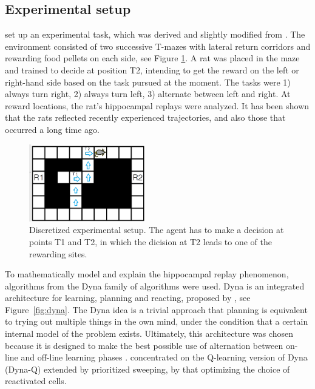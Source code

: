 \documentclass[a4paper]{article}
\begin{document}
	\subsection{Experimental setup}
	\par \cite{NeuralDynaQ} set up an experimental task, which was derived and slightly modified from \cite{GUPTA2010695}. The environment consisted of two successive T-mazes with lateral return corridors and rewarding food pellets on each side, see Figure \ref{fig:setup}. A rat was placed in the maze and trained to decide at position T2, intending to get the reward on the left or right-hand side based on the task pursued at the moment. The tasks were 1) always turn right, 2) always turn left, 3) alternate between left and right. At reward locations, the rat's hippocampal replays were analyzed. It has been shown that the rats reflected recently experienced trajectories, and also those that occurred a long time ago.
	
	\begin{figure}[t]
		\centering
		\includegraphics[angle=0,width=0.45\textwidth]{./figs/setup.png}
		\caption{\label{fig:setup}Discretized experimental setup. The agent has to make a decision at points T1 and T2, in which the dicision at T2 leads to one of the rewarding sites. \citep{NeuralDynaQ}}
	\end{figure}
	
	\par To mathematically model and explain the hippocampal replay phenomenon, algorithms from the Dyna family of algorithms were used. Dyna is an integrated architecture for learning, planning and reacting, proposed by \cite{Dyna}, see Figure~\ref{fig:dyna}. The Dyna idea is a trivial approach that planning is equivalent to trying out multiple things in the own mind, under the condition that a certain internal model of the problem exists. Ultimately, this architecture was chosen because it is designed to make the best possible use of alternation between on-line and off-line learning phases \citep{Dyna}. \cite{NeuralDynaQ} concentrated on the Q-learning version of Dyna (Dyna-Q) extended by prioritized sweeping, by that optimizing the choice of reactivated cells.
	
\end{document}
